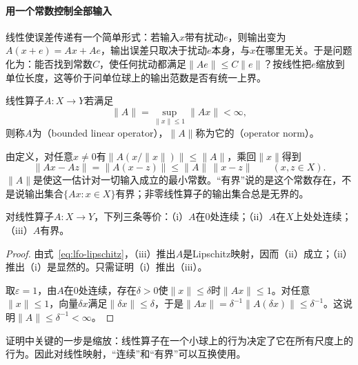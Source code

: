 \paragraph{用一个常数控制全部输入}
线性使误差传递有一个简单形式：若输入$x$带有扰动$e$，则输出变为$A(x+e)=Ax+Ae$，输出误差只取决于扰动$e$本身，与$x$在哪里无关。于是问题化为：能否找到常数$C$，使任何扰动都满足$\|Ae\|\leq C\|e\|$？按线性把$e$缩放到单位长度，这等价于问单位球上的输出范数是否有统一上界。

\begin{definition}[有界线性算子与算子范数]
\label{def:lfo-operator-norm}
线性算子$A:X\to Y$若满足
\begin{equation}
 \|A\|=\sup_{\|x\|\leq1}\|Ax\|<\infty ,
 \label{eq:lfo-operator-norm}
\end{equation}
则称$A$为（bounded linear operator），$\|A\|$称为它的（operator norm）。
\end{definition}

由定义，对任意$x\neq0$有$\|A(x/\|x\|)\|\leq\|A\|$，乘回$\|x\|$得到
\begin{equation}
 \|Ax-Az\|=\|A(x-z)\|\leq\|A\|\,\|x-z\|\qquad(x,z\in X).
 \label{eq:lfo-lipschitz}
\end{equation}
$\|A\|$是使这一估计对一切输入成立的最小常数。“有界”说的是这个常数存在，不是说输出集合$\{Ax:x\in X\}$有界；非零线性算子的输出集合总是无界的。

\begin{theorem}[有界与连续等价]
\label{thm:lfo-bounded-continuous}
对线性算子$A:X\to Y$，下列三条等价：（i）$A$在$0$处连续；（ii）$A$在$X$上处处连续；（iii）$A$有界。
\end{theorem}

\begin{proof}
由式~\eqref{eq:lfo-lipschitz}，（iii）推出$A$是Lipschitz映射，因而（ii）成立；（ii）推出（i）是显然的。只需证明（i）推出（iii）。

取$\varepsilon=1$，由$A$在$0$处连续，存在$\delta>0$使$\|x\|\leq\delta$时$\|Ax\|\leq1$。对任意$\|x\|\leq1$，向量$\delta x$满足$\|\delta x\|\leq\delta$，于是$\|Ax\|=\delta^{-1}\|A(\delta x)\|\leq\delta^{-1}$。这说明$\|A\|\leq\delta^{-1}<\infty$。
\end{proof}

证明中关键的一步是缩放：线性算子在一个小球上的行为决定了它在所有尺度上的行为。因此对线性映射，“连续”和“有界”可以互换使用。

